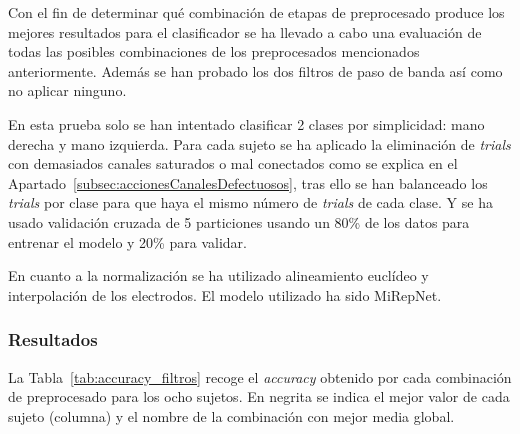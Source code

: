 Con el fin de determinar qué combinación de etapas de preprocesado produce los mejores resultados para el clasificador se ha llevado a cabo una evaluación de todas las posibles combinaciones de los preprocesados mencionados anteriormente. Además se han probado los dos filtros de paso de banda así como no aplicar ninguno. 

En esta prueba solo se han intentado clasificar 2 clases por simplicidad: mano derecha y mano izquierda. Para cada sujeto se ha aplicado la eliminación de \textit{trials} con demasiados canales saturados o mal conectados como se explica en el Apartado~\ref{subsec:accionesCanalesDefectuosos}, tras ello se han balanceado los \textit{trials} por clase para que haya el mismo número de \textit{trials} de cada clase. Y se ha usado validación cruzada de 5 particiones usando un 80\% de los datos para entrenar el modelo y 20\% para validar. 

En cuanto a la normalización se ha utilizado alineamiento euclídeo y interpolación de los electrodos. El modelo utilizado ha sido MiRepNet.


\subsubsection{Resultados}

La Tabla~\ref{tab:accuracy_filtros} recoge el \textit{accuracy} obtenido por cada combinación de preprocesado para los ocho sujetos. En negrita se indica el mejor valor de cada sujeto (columna) y el nombre de la combinación con mejor media global.

